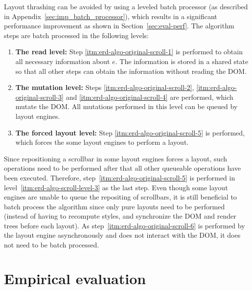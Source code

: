 \documentclass[]{llncs}
\begin{document}
  \noindent
  Layout thrashing can be avoided by using a leveled batch processor (as described in Appendix~\ref{sec:imp_batch_processor}), which results in a significant performance improvement as shown in Section~\ref{sec:eval-perf}.
  The algorithm steps are batch processed in the following levels:
  \begin{enumerate}
    \item\label{itm:erd-algo-scroll-level-1}
      \textbf{The read level:}
      Step \ref{itm:erd-algo-original-scroll-1} is performed to obtain all necessary information about $e$.
      The information is stored in a shared state so that all other steps can obtain the information without reading the DOM.
    \item\label{itm:erd-algo-scroll-level-2}
      \textbf{The mutation level:}
      Steps \ref{itm:erd-algo-original-scroll-2}, \ref{itm:erd-algo-original-scroll-3} and \ref{itm:erd-algo-original-scroll-4} are performed, which mutate the DOM.
      All mutations performed in this level can be queued by layout engines.
    \item\label{itm:erd-algo-scroll-level-3}
      \textbf{The forced layout level:}
      Step \ref{itm:erd-algo-original-scroll-5} is performed, which forces the some layout engines to perform a layout.
  \end{enumerate}

  \noindent
  Since repositioning a scrollbar in some layout engines forces a layout, such operations need to be performed after that all other queueable operations have been executed.
  Therefore, step~\ref{itm:erd-algo-original-scroll-5} is performed in level~\ref{itm:erd-algo-scroll-level-3} as the last step.
  Even though some layout engines are unable to queue the repositing of scrollbars, it is still beneficial to batch process the algorithm since only pure layouts need to be performed (instead of having to recompute styles, and synchronize the DOM and render trees before each layout).
  As step~\ref{itm:erd-algo-original-scroll-6} is performed by the layout engine asynchronously and does not interact with the DOM, it does not need to be batch processed.


\section{Empirical evaluation}\label{sec:eval}
\end{document}
